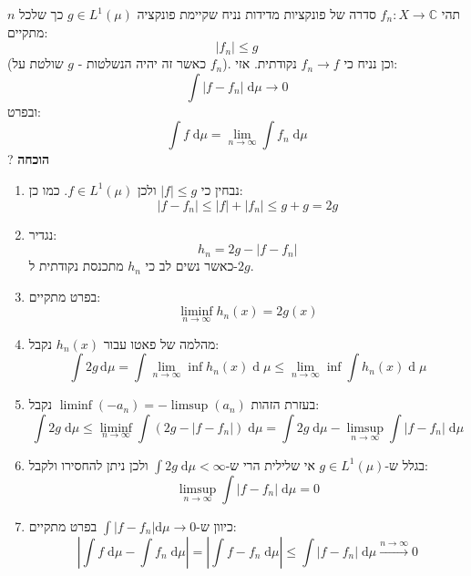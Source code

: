 \documentclass{tstextbook}
\begin{document}
\begin{theorem}
תהי \(f_{n}:X\to \mathbb{C}\) סדרה של פונקציות מדידות נניח שקיימת פונקציה \(g \in L^{1}\left( \mu \right)\) כך שלכל \(n\) מתקיים:
$$\lvert f_{n} \rvert \leq g$$
(כאשר זה יהיה הנשלטות - \(g\) שולטת על \(f_{n}\)). וכן נניח כי \(f_{n}\to f\) נקודתית. אזי:
$$\int \lvert f-f_{n} \rvert  \;\mathrm{d} \mu \xrightarrow{} 0 $$
ובפרט:
$$\int f \;\mathrm{d} \mu = \lim_{ n \to \infty } \int f_{n} \;\mathrm{d} \mu  $$
?
\textbf{הוכחה}

  \begin{enumerate}
    \item נבחין כי \(\lvert f \rvert\leq g\) ולכן \(f \in L^{1}\left( \mu \right)\). כמו כן: 
$$\lvert f-f_{n} \rvert \leq \lvert f \rvert +\lvert f_{n} \rvert \leq g+g = 2g$$


    \item נגדיר: 
$$h_{n}=2g-\lvert f-f_{n} \rvert $$
כאשר נשים לב כי \(h_{n}\) מתכנסת נקודתית ל-\(2g\).


    \item בפרט מתקיים: 
$$\liminf_{ n \to \infty } h_{n}(x)=2g(x) $$


    \item מהלמה של פאטו עבור \(h_{n}(x)\) נקבל: 
$$\int2g\,\mathrm{d}\mu=\int\operatorname*{lim}_{n\to\infty}\operatorname*{inf}h_{n}(x)\operatorname{d}\!\mu\leq\operatorname*{lim}_{n\to\infty}\operatorname*{inf}\int h_{n}(x)\operatorname{d}\!\mu$$


    \item בעזרת הזהות \(\liminf(-a_{n})=-\limsup(a_{n})\) נקבל: 
$$\int 2g \;\mathrm{d} \mu \leq \liminf_{ n \to \infty }  \int\left( 2g-\lvert f-f_{n} \rvert  \right)\;\mathrm{d}\mu=\int 2g \;\mathrm{d} \mu - \limsup_{ n \to \infty }  \int \lvert f-f_{n} \rvert  \;\mathrm{d} \mu $$


    \item בגלל ש-\(g \in L^{1}\left( \mu \right)\) אי שלילית הרי ש-\(\int 2g \;\mathrm{d} \mu< \infty\) ולכן ניתן להחסירו ולקבל: 
$$\limsup_{ n \to \infty }\int \lvert f-f_{n} \rvert  \;\mathrm{d} \mu =0  $$


    \item כיוון ש-\(\int\lvert f-f_{n} \rvert\mathrm{d}\mu\to 0\) בפרט מתקיים: 
$$\left\lvert  \int f \;\mathrm{d} \mu -\int f_{n} \;\mathrm{d} \mu   \right\rvert =\left\lvert  \int f-f_{n} \;\mathrm{d} \mu   \right\rvert \leq \int \lvert f-f_{n} \rvert  \;\mathrm{d} \mu \xrightarrow{n\to \infty} 0 $$


  \end{enumerate}
\end{theorem}
\end{document}
